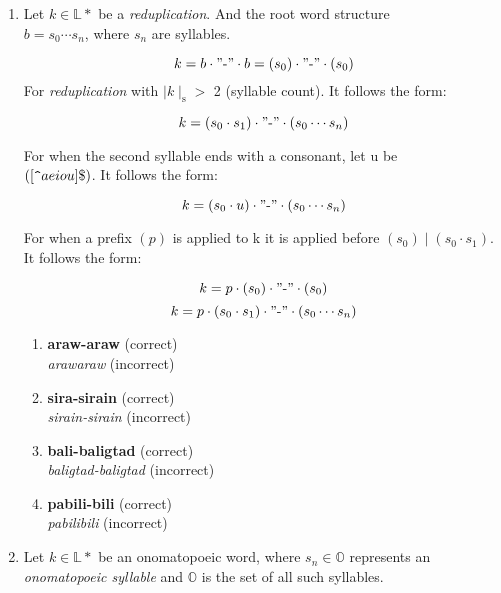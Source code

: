 \begin{enumerate}
      \item
            Let \(k \in \mathbb{L}*\) be a \textit{reduplication}. And the root word structure
            \\ \(b = s_0\cdots s_n\), where \(s_n\) are syllables.

            \[
                  k = b \cdot "\text{-}" \cdot b = (s_0) \cdot "\text{-}" \cdot (s_0)
            \]
            For \textit{reduplication} with $\mid k\mid_{\text{s}}>$ 2 (syllable count). It follows the form:

            \[
                  k = (s_0 \cdot s_1) \cdot "\text{-}" \cdot (s_0 \cdots s_n)
            \]

            For when the second syllable ends with a consonant, let u be\\
            \(([\verb|^|aeiou]\$)\). It follows the form:

            \[
                  k = (s_0 \cdot u) \cdot "\text{-}" \cdot (s_0 \cdots s_n)
            \]

            For when a prefix \((p)\) is applied to k it is applied before \((s_0) \mid (s_0 \cdot s_1)\). It follows the form:

            \[
                  k = p \cdot (s_0) \cdot "\text{-}" \cdot (s_0)
            \]
            \[
                  k = p \cdot (s_0 \cdot s_1) \cdot "\text{-}" \cdot (s_0 \cdots s_n)
            \]
            \begin{example}
            \end{example}
            \begin{enumerate}
                  \item \textbf{araw-araw} (correct) \\
                        \textit{arawaraw} (incorrect)
                  \item \textbf{sira-sirain} (correct) \\
                        \textit{sirain-sirain} (incorrect)
                  \item \textbf{bali-baligtad} (correct) \\
                        \textit{baligtad-baligtad} (incorrect)
                  \item \textbf{pabili-bili} (correct) \\
                        \textit{pabilibili} (incorrect)            
            \end{enumerate}
      \item
            Let \( k \in \mathbb{L}* \) be an onomatopoeic word, where \( s_n \in \mathbb{O} \) represents an \textit{onomatopoeic syllable} and \( \mathbb{O} \) is the set of all such syllables.


\end{enumerate}
